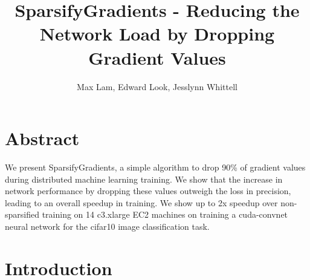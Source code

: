 \documentclass[10pt]{article}
\author{Max Lam, Edward Look, Jesslynn Whittell}
\date{}
\title{SparsifyGradients - Reducing the Network Load by Dropping Gradient Values}
\begin{document}
\maketitle

\section{Abstract}
\label{sec-1}

We present SparsifyGradients, a simple algorithm to drop 90\% of
gradient values during distributed machine learning training. We show
that the increase in network performance by dropping these values
outweigh the loss in precision, leading to an overall speedup in
training. We show up to 2x speedup over non-sparsified training on 14
c3.xlarge EC2 machines on training a cuda-convnet neural network for
the cifar10 image classification task.

\section{Introduction}
\label{sec-2}
\end{document}
